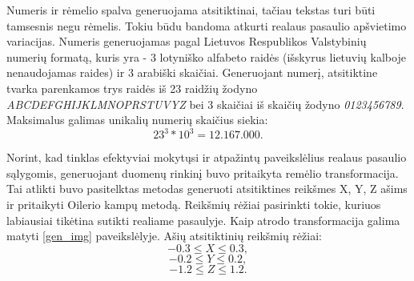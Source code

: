 \documentclass{VUMIFInfBakalaurinis}
\begin{document}
Numeris ir rėmelio spalva generuojama atsitiktinai, tačiau tekstas turi būti tamsesnis negu rėmelis. Tokiu būdu bandoma atkurti realaus pasaulio apšvietimo variacijas.
Numeris generuojamas pagal Lietuvos Respublikos Valstybinių numerių formatą, kuris yra - 3 lotyniško alfabeto
raidės (išskyrus lietuvių kalboje nenaudojamas raides) ir 3 arabiški skaičiai. Generuojant numerį, 
atsitiktine tvarka parenkamos trys raidės iš 23 raidžių žodyno \textit{ABCDEFGHIJKLMNOPRSTUVYZ} bei 3 skaičiai 
iš skaičių žodyno \textit{0123456789}. Maksimalus galimas unikalių numerių skaičius siekia:
\begin{equation*}
  23^3 * 10^3 = 12.167.000.
\end{equation*}


Norint, kad tinklas efektyviai mokytųsi ir atpažintų paveikslėlius realaus pasaulio sąlygomis, generuojant duomenų
rinkinį buvo pritaikyta remėlio transformacija. Tai atlikti buvo pasitelktas metodas generuoti atsitiktines
reikšmes X, Y, Z ašims ir pritaikyti Oilerio kampų metodą\cite{slabaugh1999computing}. 
Reikšmių rėžiai pasirinkti tokie, kuriuos labiausiai tikėtina sutikti realiame pasaulyje.
Kaip atrodo transformacija galima matyti \ref{gen_img} paveikslėlyje.
Ašių atsitiktinių reikšmių rėžiai:
\begin{equation*}
  -0.3 \leq X \leq 0.3,
\end{equation*}
\begin{equation*}
  -0.2 \leq Y \leq 0.2,
\end{equation*}
\begin{equation*}
  -1.2 \leq Z \leq 1.2.
\end{equation*}
\end{document}
